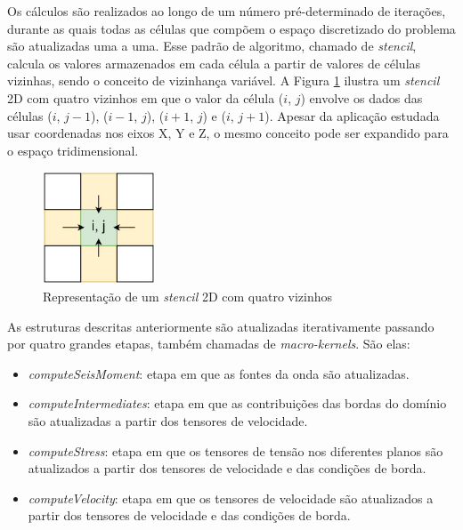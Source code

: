 \documentclass[cic,tc]{iiufrgs}
\begin{document}
Os cálculos são realizados ao longo de um número pré-determinado de iterações, durante as quais todas as células que compõem o espaço discretizado do problema são atualizadas uma a uma. Esse
padrão de algoritmo, chamado de \textit{stencil}, calcula os valores armazenados em cada célula a partir de valores de células vizinhas, sendo o conceito de vizinhança variável. A Figura
\ref{fig:stencil} ilustra um \textit{stencil} 2D com quatro vizinhos em que o valor da célula ($i$, $j$) envolve os dados das células ($i$, $j-1$), ($i-1$, $j$), ($i+1$, $j$) e ($i$, $j+1$).
Apesar da aplicação estudada usar coordenadas nos eixos X, Y e Z, o mesmo conceito pode ser expandido para o espaço tridimensional.

\begin{figure}[!htb]
    \caption{Representação de um \textit{stencil} 2D com quatro vizinhos}
    \begin{center}
      \includegraphics[width=9em]{stencil}
    \end{center}
    \label{fig:stencil}
\end{figure}

As estruturas descritas anteriormente são atualizadas iterativamente passando por quatro grandes etapas, também chamadas de \textit{macro-kernels}. São elas:

\begin{itemize}
\item{\textit{computeSeisMoment}:} etapa em que as fontes da onda são atualizadas.
\item{\textit{computeIntermediates}:} etapa em que as contribuições das bordas do domínio são atualizadas a partir dos tensores de velocidade.
\item{\textit{computeStress}:} etapa em que os tensores de tensão nos diferentes planos são atualizados a partir dos tensores de velocidade e das condições de borda.
\item{\textit{computeVelocity}:} etapa em que os tensores de velocidade são atualizados a partir dos tensores de velocidade e das condições de borda.
\end{itemize}
\end{document}
